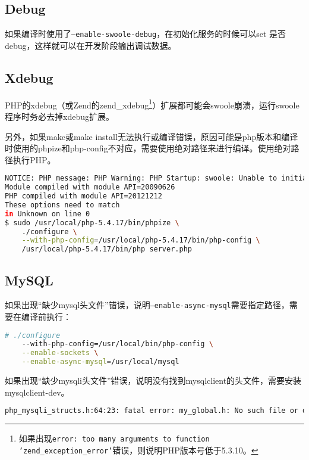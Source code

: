 \subsection{Debug}


如果编译时使用了\texttt{--enable-swoole-debug}，在初始化服务的时候可以set 是否debug，这样就可以在开发阶段输出调试数据。



\subsection{Xdebug}

PHP的xdebug（或Zend的zend\_xdebug\footnote{如果出现\texttt{error: too many arguments to function 'zend\_exception\_error'}错误，则说明PHP版本号低于5.3.10。}）扩展都可能会swoole崩溃，运行swoole程序时务必去掉xdebug扩展。

另外，如果make或make install无法执行或编译错误，原因可能是php版本和编译时使用的phpize和php-config不对应，需要使用绝对路径来进行编译。使用绝对路径执行PHP。

\begin{lstlisting}[language=bash]
NOTICE: PHP message: PHP Warning: PHP Startup: swoole: Unable to initialize module
Module compiled with module API=20090626
PHP compiled with module API=20121212
These options need to match
in Unknown on line 0
$ sudo /usr/local/php-5.4.17/bin/phpize \
	./configure \
	--with-php-config=/usr/local/php-5.4.17/bin/php-config \
	/usr/local/php-5.4.17/bin/php server.php
\end{lstlisting}


\subsection{MySQL}


如果出现“缺少mysql头文件”错误，说明\texttt{--enable-async-mysql}需要指定路径，需要在编译前执行：

\begin{lstlisting}[language=bash]
# ./configure 
	--with-php-config=/usr/local/bin/php-config \
	--enable-sockets \
	--enable-async-mysql=/usr/local/mysql
\end{lstlisting}

如果出现“缺少mysqli头文件”错误，说明没有找到mysqlclient的头文件，需要安装mysqlclient-dev。

\begin{lstlisting}[language=bash]
php_mysqli_structs.h:64:23: fatal error: my_global.h: No such file or directory
\end{lstlisting}


